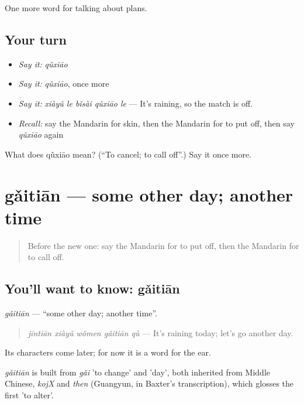 \begin{grammarlens}[title={What you've built}]
One more word for talking about plans.
\end{grammarlens}

\subsection*{Your turn}
\begin{itemize}
\raggedright
  \item \emph{Say it:} \emph{qǔxiāo}
  \item \emph{Say it:} \emph{qǔxiāo}, once more
  \item \emph{Say it:} \emph{xiàyǔ le bǐsài qǔxiāo le} — It's raining, so the match is off.
  \item \emph{Recall:} say the Mandarin for skin, then the Mandarin for to put off, then say \emph{qǔxiāo} again
\end{itemize}

\begin{tcolorbox}[breakable,colback=teal!4,colframe=teal!35!black,title={Before you move on}]
What does qǔxiāo mean? (\textquotedblleft{}To cancel; to call off\textquotedblright{}.) Say it once more.
\end{tcolorbox}
\section[gǎitiān]{gǎitiān — some other day; another time}

\label{lesson:ZH-C234-gaitian}



\begin{quote}
Before the new one: say the Mandarin for to put off, then the Mandarin for to call off.
\end{quote}

\subsection*{You'll want to know: gǎitiān}
\emph{gǎitiān} — \textquotedblleft{}some other day; another time\textquotedblright{}.

\begin{quote}
\emph{jīntiān xiàyǔ wǒmen gǎitiān qù} — It's raining today; let's go another day.
\end{quote}

Its characters come later; for now it is a word for the ear.

\begin{cousinweb}
\emph{gǎitiān} is built from \emph{gǎi} 'to change' and  'day', both inherited from Middle Chinese, \emph{kojX} and \emph{then} (Guangyun, in Baxter's transcription), which glosses the first 'to alter'.
\end{cousinweb}

